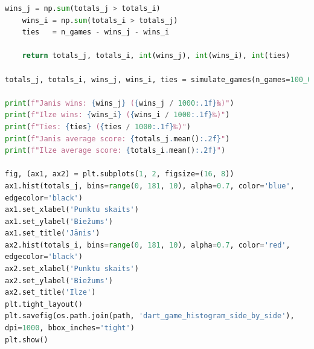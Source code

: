 \documentclass[12pt]{article}
\begin{document}
\begin{lstlisting}[language=Python]
    wins_j = np.sum(totals_j > totals_i)
    wins_i = np.sum(totals_i > totals_j)
    ties   = n_games - wins_j - wins_i

    return totals_j, totals_i, int(wins_j), int(wins_i), int(ties)

totals_j, totals_i, wins_j, wins_i, ties = simulate_games(n_games=100_000)

print(f"Janis wins: {wins_j} ({wins_j / 1000:.1f}‰)")
print(f"Ilze wins: {wins_i} ({wins_i / 1000:.1f}‰)")
print(f"Ties: {ties} ({ties / 1000:.1f}‰)")
print(f"Janis average score: {totals_j.mean():.2f}")
print(f"Ilze average score: {totals_i.mean():.2f}")

fig, (ax1, ax2) = plt.subplots(1, 2, figsize=(16, 8))
ax1.hist(totals_j, bins=range(0, 181, 10), alpha=0.7, color='blue',
edgecolor='black')
ax1.set_xlabel('Punktu skaits')
ax1.set_ylabel('Biežums')
ax1.set_title('Jānis')
ax2.hist(totals_i, bins=range(0, 181, 10), alpha=0.7, color='red',
edgecolor='black')
ax2.set_xlabel('Punktu skaits')
ax2.set_ylabel('Biežums')
ax2.set_title('Ilze')
plt.tight_layout()
plt.savefig(os.path.join(path, 'dart_game_histogram_side_by_side'),
dpi=1000, bbox_inches='tight')
plt.show()   
\end{lstlisting}
\end{document}
